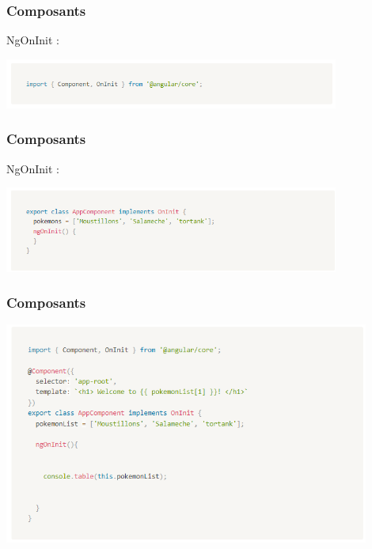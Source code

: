 \documentclass[10pt]{beamer}
\begin{document}
	\begin{frame}
		\frametitle{Composants}

		NgOnInit : \newline \newline


		\centering
		\includegraphics[width=11cm]{assets/ngoninit1} \newline


	\end{frame}

	\begin{frame}
		\frametitle{Composants}

		NgOnInit : \newline \newline


		\centering
		\includegraphics[width=11cm]{assets/ngoninit2} \newline


	\end{frame}

	\begin{frame}
		\frametitle{Composants}

		\centering
		\includegraphics[width=12cm]{assets/consoleTable} \newline


	\end{frame}
\end{document}
